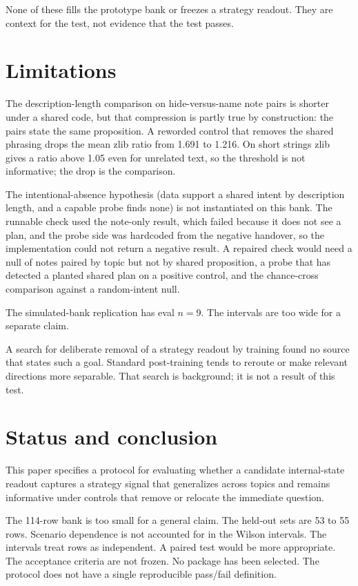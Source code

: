 \documentclass[11pt,a4paper]{article}
\begin{document}
None of these fills the prototype bank or freezes a strategy readout.
They are context for the test, not evidence that the test passes.

\section{Limitations}

The description-length comparison on hide-versus-name note pairs is
shorter under a shared code, but that compression is partly true by
construction: the pairs state the same proposition. A reworded control
that removes the shared phrasing drops the mean zlib ratio from 1.691 to
1.216. On short strings zlib gives a ratio above 1.05 even for unrelated
text, so the threshold is not informative; the drop is the comparison.

The intentional-absence hypothesis (data support a shared intent by
description length, and a capable probe finds none) is not instantiated
on this bank. The runnable check used the note-only result, which failed
because it does not see a plan, and the probe side was hardcoded from
the negative handover, so the implementation could not return a negative
result. A repaired check would need a null of notes paired by topic but
not by shared proposition, a probe that has detected a planted shared
plan on a positive control, and the chance-cross comparison against a
random-intent null.

The simulated-bank replication has eval \(n = 9\). The intervals are too
wide for a separate claim.

A search for deliberate removal of a strategy readout by training found
no source that states such a goal. Standard post-training tends to
reroute or make relevant directions more separable. That search is
background; it is not a result of this test.

\section{Status and conclusion}

This paper specifies a protocol for evaluating whether a candidate
internal-state readout captures a strategy signal that generalizes
across topics and remains informative under controls that remove or
relocate the immediate question.

The 114-row bank is too small for a general claim. The held-out sets are
53 to 55 rows. Scenario dependence is not accounted for in the Wilson
intervals. The intervals treat rows as independent. A paired test would
be more appropriate. The acceptance criteria are not frozen. No package
has been selected. The protocol does not have a single reproducible
pass/fail definition.
\end{document}
